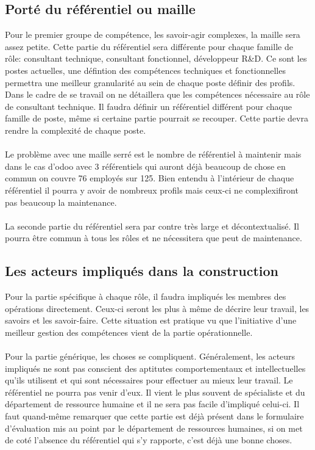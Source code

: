 \subsection{Porté du référentiel ou maille}
Pour le premier groupe de compétence, les savoir-agir complexes, la maille sera assez petite. Cette partie du référentiel sera différente pour chaque famille de rôle: consultant technique, consultant fonctionnel, développeur R\&D. Ce sont les postes actuelles, une défintion des compétences techniques et fonctionnelles permettra une meilleur granularité au sein de chaque poste définir des profils. Dans le cadre de se travail on ne détaillera que les compétences nécessaire au rôle de consultant technique. Il faudra définir un référentiel différent pour chaque famille de poste, même si certaine partie pourrait se recouper. Cette partie devra rendre la complexité de chaque poste. 

\paragraph{}Le problème avec une maille serré est le nombre de référentiel à maintenir mais dans le cas d'odoo avec 3 référentiels qui auront déjà beaucoup de chose en commun on couvre 76 employés sur 125. Bien entendu à l'intérieur de chaque référentiel il pourra y avoir de nombreux profils mais ceux-ci ne complexifiront pas beaucoup la maintenance.

\paragraph{}La seconde partie du référentiel sera par contre très large et décontextualisé. Il pourra être commun à tous les rôles et ne nécessitera que peut de maintenance. 

\subsection{Les acteurs impliqués dans la construction}
Pour la partie spécifique à chaque rôle, il faudra impliqués les membres des opérations directement. Ceux-ci seront les plus à même de décrire leur travail, les savoirs et les savoir-faire. Cette situation est pratique vu que l'initiative d'une meilleur gestion des compétences vient de la partie opérationnelle.

\paragraph{}Pour la partie générique, les choses se compliquent. Généralement, les acteurs impliqués ne sont pas conscient des aptitutes comportementaux et intellectuelles qu'ils utilisent et qui sont nécessaires pour effectuer au mieux leur travail. Le référentiel ne pourra pas venir d'eux. Il vient le plus souvent de spécialiste et du département de ressource humaine et il ne sera pas facile d'impliqué celui-ci. Il faut quand-même remarquer que cette partie est déjà présent dans le formulaire d'évaluation mis au point par le département de ressources humaines, si on met de coté l'absence du référentiel qui s'y rapporte, c'est déjà une bonne choses.



